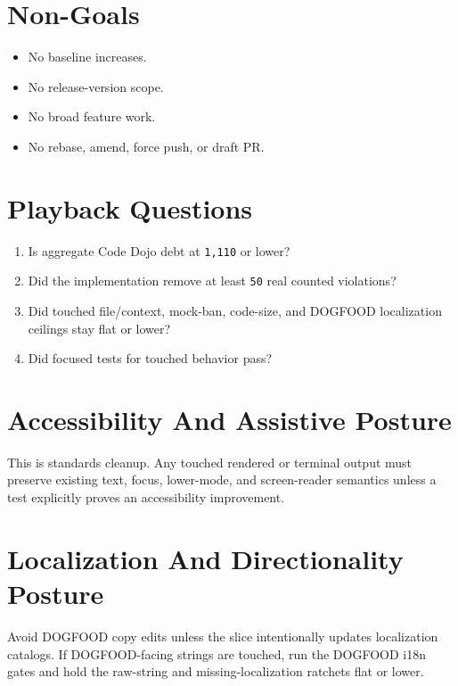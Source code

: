 \section{Non-Goals}\label{record-233-non-goals}

\begin{itemize}
\tightlist
\item
  No baseline increases.
\item
  No release-version scope.
\item
  No broad feature work.
\item
  No rebase, amend, force push, or draft PR.
\end{itemize}

\section{Playback Questions}\label{record-233-playback-questions}

\begin{enumerate}
\def\labelenumi{\arabic{enumi}.}
\tightlist
\item
  Is aggregate Code Dojo debt at \texttt{1\allowbreak{},\allowbreak{}1\allowbreak{}1\allowbreak{}0} or lower?
\item
  Did the implementation remove at least \texttt{5\allowbreak{}0} real counted violations?
\item
  Did touched file/context, mock-ban, code-size, and DOGFOOD localization ceilings stay flat or lower?
\item
  Did focused tests for touched behavior pass?
\end{enumerate}

\section{Accessibility And Assistive Posture}\label{record-233-accessibility-and-assistive-posture}

This is standards cleanup. Any touched rendered or terminal output must preserve existing text, focus, lower-mode, and screen-reader semantics unless a test explicitly proves an accessibility improvement.

\section{Localization And Directionality Posture}\label{record-233-localization-and-directionality-posture}

Avoid DOGFOOD copy edits unless the slice intentionally updates localization catalogs. If DOGFOOD-facing strings are touched, run the DOGFOOD i18n gates and hold the raw-string and missing-localization ratchets flat or lower.

